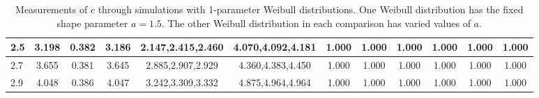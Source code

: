 \begin{table*}[h!]
\begin{center}
\begin{tabular}{| l | c | c | c | c | c | c | c | c | c | c | c |}
2.5 & 3.198 & 0.382 & 3.186 & 2.147,2.415,2.460 & 4.070,4.092,4.181  & 1.000  & 1.000  & 1.000  & 1.000  & 1.000  & 1.000 \\\hline
2.7 & 3.655 & 0.381 & 3.645 & 2.885,2.907,2.929 & 4.360,4.383,4.450  & 1.000  & 1.000  & 1.000  & 1.000  & 1.000  & 1.000 \\\hline
2.9 & 4.048 & 0.386 & 4.047 & 3.242,3.309,3.332 & 4.875,4.964,4.964  & 1.000  & 1.000  & 1.000  & 1.000  & 1.000  & 1.000 \\\hline
\end{tabular}
\caption{Measurements of $c$ through simulations
with 1-parameter Weibull distributions.
One Weibull distribution has the fixed shape parameter $a=1.5$.
The other Weibull distribution in each comparison
has varied values of $a$.}
\end{center}
\end{table*}